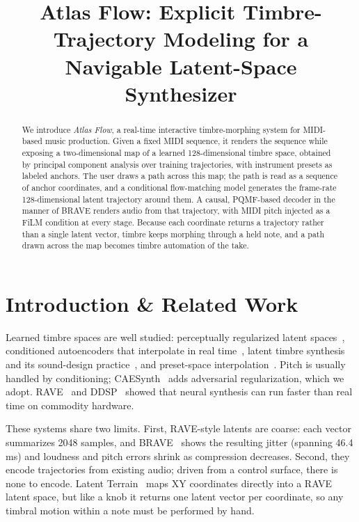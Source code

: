 \documentclass{article}
\title{Atlas Flow: Explicit Timbre-Trajectory Modeling for a Navigable Latent-Space Synthesizer}
\begin{document}
%
\maketitle
%
\begin{abstract}
We introduce \textit{Atlas Flow}, a real-time interactive
timbre-morphing system for MIDI-based music production. Given a fixed
MIDI sequence, it renders the sequence while exposing a two-dimensional
map of a learned 128-dimensional timbre space, obtained by principal
component analysis over training trajectories, with instrument presets
as labeled anchors. The user draws a path across this map; the path is
read as a sequence of anchor coordinates, and a conditional
flow-matching model generates the frame-rate 128-dimensional latent
trajectory around them. A causal, PQMF-based decoder in the manner of
BRAVE renders audio from that trajectory, with MIDI pitch injected as a
FiLM condition at every stage. Because each coordinate returns a trajectory
rather than a single latent vector, timbre keeps morphing through a held note,
and a path drawn across the map becomes timbre automation of the take. 
\end{abstract}
%
\section{Introduction \& Related Work}\label{sec:introduction}

Learned timbre spaces are well studied: perceptually regularized latent
spaces~\cite{esling2018generativetimbrespacesregularizing}, conditioned
autoencoders that interpolate in real
time~\cite{colonel2020conditioningautoencoderlatentspaces,puche2021caesynthrealtimetimbreinterpolation},
latent timbre synthesis and its sound-design
practice~\cite{Tatar_2020,tatar2023sounddesignstrategieslatent}, and
preset-space interpolation~\cite{10596701}. Pitch is usually handled by
conditioning; CAESynth~\cite{puche2021caesynthrealtimetimbreinterpolation}
adds adversarial regularization, which we adopt.
RAVE~\cite{caillon2021ravevariationalautoencoderfast} and
DDSP~\cite{engel2020ddspdifferentiabledigitalsignal} showed that neural
synthesis can run faster than real time on commodity hardware.

These systems share two limits. First, RAVE-style latents are coarse:
each vector summarizes 2048 samples, and
BRAVE~\cite{caspe2025designingneuralsynthesizerslowlatency} shows the
resulting jitter (spanning 46.4\,ms) and loudness and pitch errors shrink
as compression decreases. Second, they encode
trajectories from existing audio; driven from a control surface, there is
none to encode. Latent Terrain~\cite{zheng_latent_2026} maps XY
coordinates directly into a RAVE latent space, but like a knob it returns
one latent vector per coordinate, so any timbral motion within a note
must be performed by hand.
\end{document}
